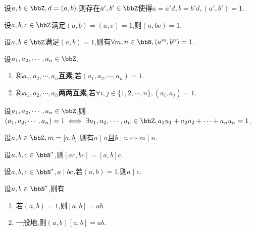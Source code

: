 \begin{prop}
    设$a, b \in \bbZ, d = (a, b)$.则存在$a', b' \in \bbZ$使得$a = a'd, b = b'd, (a', b') = 1$.
\end{prop}

\begin{prop}
    设$a, b, c \in \bbZ$满足$(a, b) = (a, c) = 1$,则$(a, bc) = 1$.
\end{prop}

\begin{cor}
    设$a, b \in \bbZ$满足$(a, b) = 1$,则有$\forall m, n \in \bbN, (a^m, b^n) = 1$.
\end{cor}

\begin{deff}
    设$a_1, a_2, \cdots, a_n \in \bbZ$.
    \begin{enumerate}
        \item 称$a_1, a_2, \cdots, a_n$\textbf{互素},若$(a_1, a_2, \cdots, a_n) = 1$.
        \item 称$a_1, a_2, \cdots, a_n$\textbf{两两互素},若$\forall i, j \in \{ 1, 2, \cdots, n \}, (a_i, a_j) = 1$.
    \end{enumerate}
\end{deff}

\begin{prop}
    设$a_1, a_2, \cdots, a_n \in \bbZ$,则$(a_1, a_2, \cdots, a_n) = 1 \iff \exists u_1, u_2, \cdots, u_n \in \bbZ, a_1u_1 + a_2u_2 + \cdots + a_nu_n = 1$.
\end{prop}

\begin{prop}
    设$a, b \in \bbZ, m = [a, b]$,则有$a \mid n \text{且} b \mid n \iff m \mid n$.
\end{prop}

\begin{prop}
    设$a, b, c \in \bbN^*$,则$[ac, bc] = [a, b]c$.
\end{prop}

\begin{lem}[Gauss]
    设$a, b, c \in \bbN^*, a \mid bc$,若$(a, b) = 1$,则$a \mid c$.
\end{lem}

\begin{prop}
    设$a, b \in \bbN^*$,则有
    \begin{enumerate}
        \item 若$(a, b) = 1$,则$[a, b] = ab$.
        \item 一般地,则$(a, b)[a, b] = ab$.
    \end{enumerate}
\end{prop}

